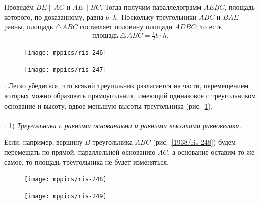 \documentclass[twoside]{book}
\begin{document}
Проведём $BE \parallel  AC$ и $AE \parallel BC$.
Тогда получим параллелограмм $AEBC$, площадь которого, по доказанному, равна $b\cdot h$.
Поскольку треугольники $ABC$ и $BAE$ равны, площадь $\triangle ABC$ составляет половину площади $ADBC$;
то есть
\[\text{площадь}~ \triangle ABC=\tfrac12b\cdot h.\]

\begin{figure}[h]
\begin{minipage}{.48\textwidth}
\centering
\texttt{[image: mppics/ris-246]}
\end{minipage}
\hfill
\begin{minipage}{.48\textwidth}
\centering
\texttt{[image: mppics/ris-247]}
\end{minipage}

\medskip

\begin{minipage}{.48\textwidth}
\centering
\caption{}\label{1938/ris-246}
\end{minipage}
\hfill
\begin{minipage}{.48\textwidth}
\centering
\caption{}\label{1938/ris-247}
\end{minipage}
\vskip-4mm
\end{figure}

\smallskip
\mbox{.}
Легко убедиться, что всякий треугольник разлагается на части, перемещением которых можно образовать прямоугольник, имеющий одинаковое с треугольником основание и высоту, вдвое меньшую высоты треугольника (рис.~\ref{1938/ris-247}).

\paragraph{}\label{1938/249}
.
1) \emph{Треугольники с равными основаниями и равными высотами равновелики.}

Если, например, вершину $B$ треугольника $ABC$ (рис.~\ref{1938/ris-248}) будем перемещать по прямой, параллельной основанию $AC$, а основание оставим то же самое, то площадь треугольника не будет изменяться.

\begin{figure}[h]
\begin{minipage}{.48\textwidth}
\centering
\texttt{[image: mppics/ris-248]}
\end{minipage}
\hfill
\begin{minipage}{.48\textwidth}
\centering
\texttt{[image: mppics/ris-249]}
\end{minipage}

\medskip

\begin{minipage}{.48\textwidth}
\centering
\caption{}\label{1938/ris-248}
\end{minipage}
\hfill
\begin{minipage}{.48\textwidth}
\centering
\caption{}\label{1938/ris-249}
\end{minipage}
\vskip-4mm
\end{figure}
\end{document}
